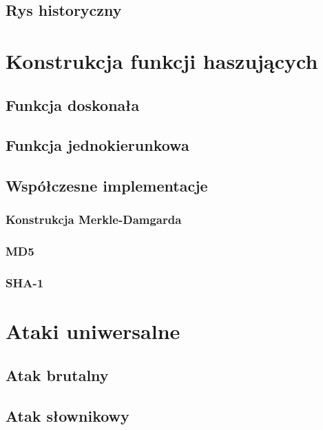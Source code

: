 \documentclass[12pt,a4paper,twoside]{article}
\begin{document}
\newpage

\subsection{Rys historyczny}

\section{Konstrukcja funkcji haszujących}

\subsection{Funkcja doskonała}

\subsection{Funkcja jednokierunkowa}

\subsection{Współczesne implementacje}

\subsubsection{Konstrukcja Merkle-Damgarda}

\subsubsection{MD5}

\subsubsection{SHA-1}

\section{Ataki uniwersalne}

\subsection{Atak brutalny}

\subsection{Atak słownikowy}
\end{document}
